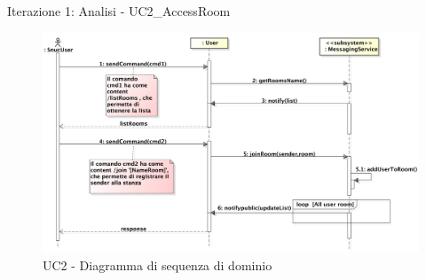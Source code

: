 \begin{frame} {Iterazione 1: Analisi - UC2\_AccessRoom}
   \begin{figure}
     \includegraphics[scale=0.20]{image_astah/Iteration_1_DomainModel/UC2_AccessRoom_SSD.png}{\centering}
     \caption{UC2 - Diagramma di sequenza di dominio}
     \label{fig_UC2_AR_SSD} 
   \end{figure}
\end{frame}

